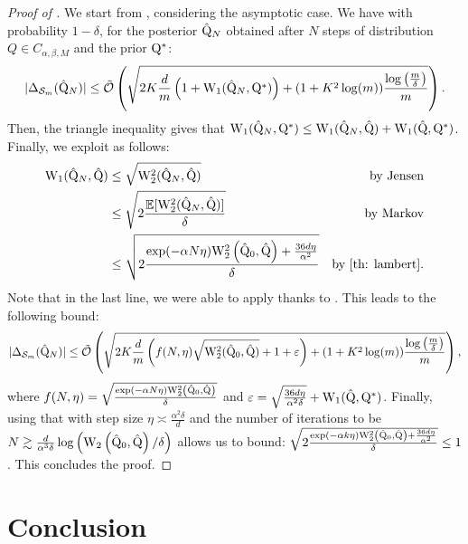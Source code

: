 \begin{proof}[Proof of ]
We start from , considering the asymptotic case. We have with probability $1-\delta$, for the posterior $\hat{\mathrm{Q}}_N$ obtained after $N$ steps of  distribution $Q\in C_{\alpha,\beta,M}$ and the prior $\mathrm{Q}^*$:
\begin{align*}
|\Delta_{\mathcal{S}_m}(\hat{\mathrm{Q}}_N)|  \leq\Tilde{\mathcal{O}}\left( \sqrt{2K\frac{d}{m}\left(1 + \mathrm{W}_{1}(\hat{\mathrm{Q}}_N,\mathrm{Q}^*)\right)+ (1+K^2\log(m))\frac{\log\left( \frac{m}{\delta} \right)}{m}}   \right).
\end{align*}
Then, the triangle inequality gives that $\mathrm{W}_{1}(\hat{\mathrm{Q}}_N,\mathrm{Q}^*) \leq \mathrm{W}_{1}(\hat{\mathrm{Q}}_N,\hat{\mathrm{Q}}) + \mathrm{W}_{1}(\hat{\mathrm{Q}},\mathrm{Q}^*)$.
Finally, we exploit  as follows:
\begin{align*}
\W_{1}(\hat{\Q}_N,\hat{\Q}) & \leq \sqrt{\W_{2}^2(\hat{\Q}_N,\hat{\Q})} & \text{by Jensen} \\
& \leq \sqrt{2\frac{\mathbb{E}[\W_{2}^2(\hat{\Q}_N,\hat{\Q})]}{\delta}} & \text{by Markov}\\
& \leq \sqrt{2\frac{\exp (-\alpha N \eta) \W_{2}^2\left(\hat{\Q}_0, \hat{\Q}\right)+\frac{36 d \eta}{\alpha^2}}{\delta}} & \text{by \Cref{th: lambert}.}
\end{align*}
Note that in the last line, we were able to apply  thanks to .
This leads to the following bound:
\begin{equation}
\label{eq: complete_bound_sgd}
|\Delta_{\mathcal{S}_m}(\hat{\mathrm{Q}}_N)|  \leq \Tilde{\mathcal{O}}\left( \sqrt{2K\frac{d}{m}\left( f(N,\eta)\sqrt{\mathrm{W}_{2}^2(\hat{\mathrm{Q}}_0,\hat{\mathrm{Q}})} + 1 +
\varepsilon \right)+ (1+K^2\log(m))\frac{\log\left( \frac{m}{\delta} \right)}{m}}   \right),
\end{equation}
where $f(N,\eta)= \sqrt{\frac{\exp (-\alpha N \eta) \mathrm{W}_{2}^2\left(\hat{\mathrm{Q}}_0, \hat{\mathrm{Q}}\right)}{\delta}}$ and $\varepsilon= \sqrt{\frac{36 d \eta}{\alpha^2\delta}} + \mathrm{W}_{1}(\hat{\mathrm{Q}},\mathrm{Q}^*)$.
Finally, using that with step size $\eta \asymp \frac{\alpha^2 \delta}{d}$ and the number of iterations to be $N \gtrsim \frac{d}{\alpha^3 \delta} \log \left(\mathrm{W}_{2}\left(\hat{\mathrm{Q}}_0, \hat{\mathrm{Q}}\right) / \delta\right)$ allows us to bound:
$\sqrt{2\frac{\exp (-\alpha k \eta) \mathrm{W}_{2}^2\left(\hat{\mathrm{Q}}_0, \hat{\mathrm{Q}}\right)+\frac{36 d \eta}{\alpha^2}}{\delta}} \leq 1$.
This concludes the proof.
\end{proof}


\section{Conclusion}

